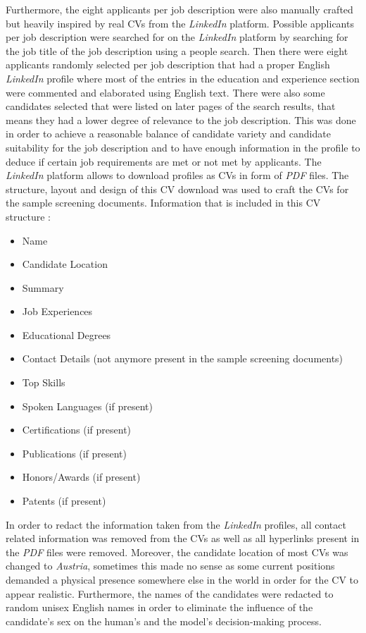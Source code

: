 \documentclass[draft,final]{thesisclass} %
\begin{document}
Furthermore, the eight applicants per job description were also manually crafted but heavily inspired by real \acs{CV}s from the \textit{LinkedIn} platform.
Possible applicants per job description were searched for on the \textit{LinkedIn} platform by searching for the job title of the job description using a people search.
Then there were eight applicants randomly selected per job description that had a proper English \textit{LinkedIn} profile where most of the entries in the education and experience section were commented and elaborated using English text.
There were also some candidates selected that were listed on later pages of the search results, that means they had a lower degree of relevance to the job description.
This was done in order to achieve a reasonable balance of candidate variety and candidate suitability for the job description and to have enough information in the profile to deduce if certain job requirements are met or not met by applicants.
The \textit{LinkedIn} platform allows to download profiles as \acs{CV}s in form of \textit{PDF} files.
The structure, layout and design of this \acs{CV} download was used to craft the \acs{CV}s for the sample screening documents.
Information that is included in this \acs{CV} structure \label{cv_structure}:
\begin{itemize}
    \item Name
    \item Candidate Location
    \item Summary
    \item Job Experiences
    \item Educational Degrees
    \item Contact Details (not anymore present in the sample screening documents)
    \item Top Skills
    \item Spoken Languages (if present)
    \item Certifications (if present)
    \item Publications (if present)
    \item Honors/Awards (if present)
    \item Patents (if present)
\end{itemize}
In order to redact the information taken from the \textit{LinkedIn} profiles, all contact related information was removed from the \acs{CV}s as well as all hyperlinks present in the \textit{PDF} files were removed.
Moreover, the candidate location of most \acs{CV}s was changed to \textit{Austria}, sometimes this made no sense as some current positions demanded a physical presence somewhere else in the world in order for the \acs{CV} to appear realistic.
Furthermore, the names of the candidates were redacted to random unisex English names in order to eliminate the influence of the candidate's sex on the human's and the model's decision-making process.
\end{document}

